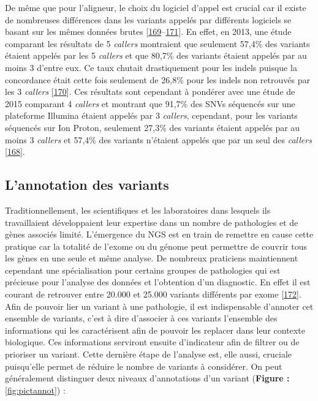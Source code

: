 \documentclass[12pt,a4paper,twoside]{ugathesis}
\theoremstyle{definition}
\theoremstyle{definition}
\theoremstyle{definition}
\theoremstyle{remark}
\begin{document}
De même que pour l'aligneur, le choix du logiciel d'appel est crucial
car il existe de nombreuses différences dans les variants appelés par
différents logiciels se basant sur les mêmes données brutes
{[}\protect\hyperlink{ref-Baes2014}{169}--\protect\hyperlink{ref-Rosenfeld2012}{171}{]}.
En effet, en 2013, une étude comparant les résultats de 5 \emph{callers}
montraient que seulement 57,4\% des variants étaient appelés par les 5
\emph{callers} et que 80,7\% des variants étaient appelés par au moins 3
d'entre eux. Ce taux chutait drastiquement pour les indels puisque la
concordance était cette fois seulement de 26,8\% pour les indels non
retrouvés par les 3 \emph{callers}
{[}\protect\hyperlink{ref-ORawe2013}{170}{]}. Ces résultats sont
cependant à pondérer avec une étude de 2015 comparant 4 \emph{callers}
et montrant que 91,7\% des SNVs séquencés sur une plateforme Illumina
étaient appelés par 3 \emph{callers}, cependant, pour les variants
séquencés sur Ion Proton, seulement 27,3\% des variants étaient appelés
par au moins 3 \emph{callers} et 57,4\% des variants n'étaient appelés
que par un seul des \emph{callers}
{[}\protect\hyperlink{ref-Hwang2015}{168}{]}.

\newpage

\subsection{L'annotation des variants}\label{lannotation-des-variants}

Traditionnellement, les scientifiques et les laboratoires dans lesquels
ils travaillaient développaient leur expertise dans un nombre de
pathologies et de gènes associés limité. L'émergence du NGS est en train
de remettre en cause cette pratique car la totalité de l'exome ou du
génome peut permettre de couvrir tous les gènes en une seule et même
analyse. De nombreux praticiens maintiennent cependant une
spécialisation pour certains groupes de pathologies qui est précieuse
pour l'analyse des données et l'obtention d'un diagnostic. En effet il
est courant de retrouver entre 20.000 et 25.000 variants différents par
exome {[}\protect\hyperlink{ref-Gonzaga-Jauregui2012}{172}{]}. Afin de
pouvoir lier un variant à une pathologie, il est indispensable d'annoter
cet ensemble de variants, c'est à dire d'associer à ces variants
l'ensemble des informations qui les caractérisent afin de pouvoir les
replacer dans leur contexte biologique. Ces informations serviront
ensuite d'indicateur afin de filtrer ou de prioriser un variant. Cette
dernière étape de l'analyse est, elle aussi, cruciale puisqu'elle permet
de réduire le nombre de variants à considérer. On peut généralement
distinguer deux niveaux d'annotations d'un variant (\textbf{Figure :}
\ref{fig:pictannot}) :
\end{document}
